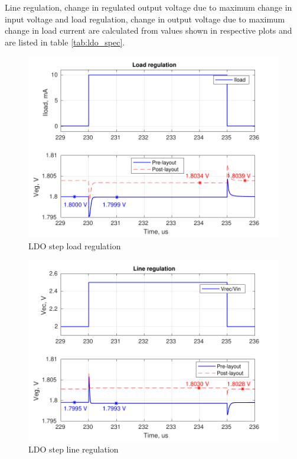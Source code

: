 \documentclass[UKenglish]{ifimaster}  %
\begin{document}
 Line regulation, change in regulated output voltage due to maximum change in input voltage and load regulation, change in output voltage due to maximum change in load current are calculated from values shown in respective plots and are listed in table \ref{tab:ldo_spec}.

\begin{figure}[htbp] %
   \centering
   \includegraphics[width=1.05\textwidth]{img/ldo_loadr_both.pdf} 
   \caption{LDO step load regulation}
   \label{fig:ldo_loadr}
\end{figure}

\begin{figure}[htbp] %
   \centering
   \includegraphics[width=1.05\textwidth]{img/ldo_liner_both.pdf} 
   \caption{LDO step line regulation}
   \label{fig:ldo_liner}
\end{figure}
\end{document}
